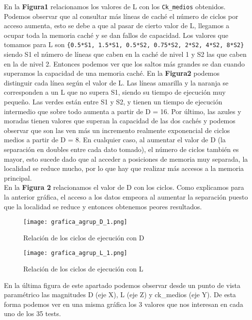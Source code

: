 \documentclass[a4paper,twocolumn]{article}
\begin{document}
	En la \textbf{Figura1} relacionamos los valores de L con los \texttt{Ck\_medios} obtenidos. Podemos observar que al consultar más líneas de caché el número de ciclos por acceso aumenta, esto se debe a que al pasar de cierto valor de L, llegamos a ocupar toda la memoria caché y se dan fallos de capacidad. Los valores que tomamos para L son \texttt{\{0.5*S1, 1.5*S1, 0.5*S2, 0.75*S2, 2*S2, 4*S2, 8*S2\}} siendo S1 el número de líneas que caben en la caché de nivel 1 y S2 las que caben en la de nivel 2. Entonces podemos ver que los saltos más grandes se dan cuando superamos la capacidad de una memoria caché. En la \textbf{Figura2} podemos distinguir cada línea según el valor de L. Las líneas amarilla y la naranja se corresponden a un L que no supera S1, siendo su tiempo de ejecución muy pequeño. Las verdes están entre S1 y S2, y tienen un tiempo de ejecución intermedio que sobre todo aumenta a partir de D = 16. Por último, las azules y moradas tienen valores que superan la capacidad de las dos cachés y podemos observar que son las ven más un incremento realmente exponencial de ciclos medios a partir de D = 8. En cualquier caso, al aumentar el valor de D (la separación en doubles entre cada dato tomado), el número de ciclos también es mayor, esto sucede dado que al acceder a posiciones de memoria muy separada, la localidad se reduce mucho, por lo que hay que realizar más accesos a la memoria principal. \\
	
	En la \textbf{Figura 2} relacionamos el valor de D con los ciclos. Como explicamos para la anterior gráfica, el acceso a los datos empeora al aumentar la separación puesto que la localidad se reduce y entonces obtenemos peores resultados.\\
	
	\begin{figure}[h!] 
        \centering
        \texttt{[image: grafica\_agrup\_D\_1.png]}
        \caption{Relación de los ciclos de ejecución con D}
    \end{figure}
	
	\begin{figure}[h!] 
        \centering
        \texttt{[image: grafica\_agrup\_L\_1.png]}
        \caption{Relación de los ciclos de ejecución con L}
    \end{figure}
    
	En la última figura de este apartado podemos observar desde un punto de vista paramétrico las magnitudes D (eje X), L (eje Z) y ck\_medios (eje Y). De esta forma podemos ver en una misma gráfica los 3 valores que nos interesan en cada uno de los 35 tests. \\
    
\end{document}
